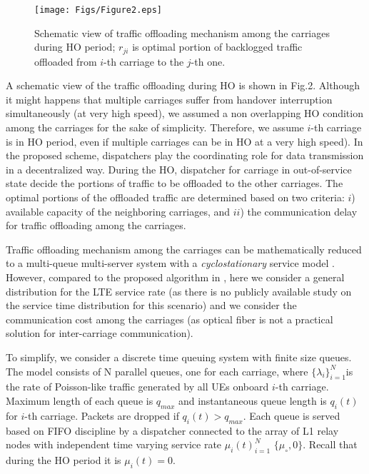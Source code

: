 \documentclass[journal]{IEEEtran}
\begin{document}
{\begin{figure}[!t]
	\centering
	\texttt{[image: Figs/Figure2.eps]}
	\caption{Schematic view of traffic offloading mechanism among the carriages during HO period; $r_{ji}$ is optimal portion of backlogged traffic offloaded from $i$-th carriage to the $j$-th one.}       
\end{figure}


A schematic view of the traffic offloading during HO is shown in Fig.2. Although it might happens that multiple carriages suffer from handover interruption simultaneously (at very high speed), we assumed a non overlapping HO condition among the carriages for the sake of simplicity. Therefore, we assume $i$-th carriage is in HO period, even if multiple carriages can be in HO at a very high speed). In the proposed scheme, dispatchers play the coordinating role for data transmission in a decentralized way. During the HO, dispatcher for carriage in out-of-service state decide the portions of traffic to be offloaded to the other carriages. The optimal portions of the offloaded traffic are determined based on two criteria: $i$) available capacity of the neighboring carriages, and $ii$) the communication delay for traffic offloading among the carriages.

Traffic offloading mechanism among the carriages can be mathematically reduced to a multi-queue multi-server system with a \textit{cyclostationary} service model \cite{Parichehreh_2015}. However, compared to the proposed algorithm in \cite{Parichehreh_2015}, here we consider a general distribution for the LTE service rate (as there is no publicly available study on the service time distribution for this scenario) and we consider the communication cost among the carriages (as optical fiber is not a practical solution for inter-carriage communication).
 
To simplify, we consider a discrete time queuing system with finite size queues. The model consists of N parallel queues, one for each carriage, where $\{\lambda_{i}\}_{i=1}^{N}$is the rate of Poisson-like traffic generated by all UEs onboard $i$-th carriage. Maximum length of each queue is $q_{max}$ and instantaneous queue length is $q_{i}(t)$ for $i$-th carriage. Packets are dropped if $q_{i}(t)>q_{max}$. Each queue is served based on FIFO discipline by a dispatcher connected to the array of L1 relay nodes with independent time varying service rate $\mu_{i}(t)_{i=1}^{N}$ \in $\{\mu_{\circ},0\}$. Recall that during the HO period it is $\mu_{i}(t)=0$.
 
}
\end{document}
